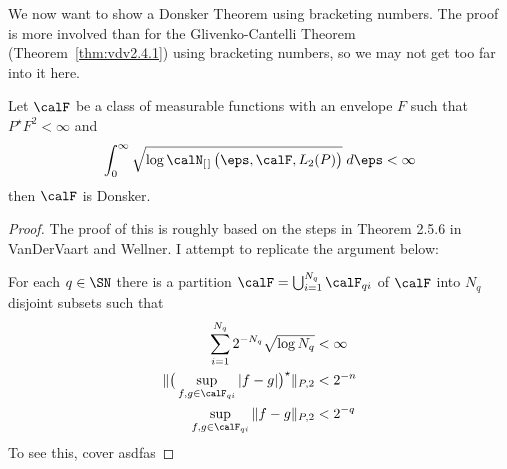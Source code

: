 
We now want to show a Donsker Theorem using bracketing numbers. The proof is more involved than for the Glivenko-Cantelli Theorem (Theorem~\ref{thm:vdv2.4.1}) using bracketing numbers, so we may not get too far into it here.

\begin{theorem}
	\label{thm:donsker-bracketing}
	Let \(\calF\) be a class of measurable functions with an envelope \(F\) such that \(P^\star F^2 < \infty\) and
	\begin{equation}
		\label{eq:donsker-bracketing-condition}
		\int_{0}^{\infty} \sqrt{\log\calN_{[\hspace{0.1em}]}\left(\eps,\calF,L_2(P)\right)}\;d\eps <\infty
	\end{equation}
	then \(\calF\) is Donsker.
\end{theorem}
\begin{proof}
	The proof of this is roughly based on the steps in Theorem 2.5.6 in VanDerVaart and Wellner. I attempt to replicate the argument below:

	For each \(q\in\SN\) there is a partition \(\calF = \bigcup_{i=1}^{N_q} \calF_{qi}\) of \(\calF\) into \(N_q\) disjoint subsets such that 
	\begin{align*}
		\sum_{i=1}^{N_q} 2^{-N_q} \sqrt{\log N_q} &< \infty \\
		\|\big(\sup_{f,g\in\calF_{qi}}|f-g|\big)^\star\|_{P,2} &< 2^{-n} \\
		\sup_{f,g\in\calF_{qi}} \|f-g\|_{P,2} &< 2^{-q}
	\end{align*}
	To see this, cover asdfas  
\end{proof}

